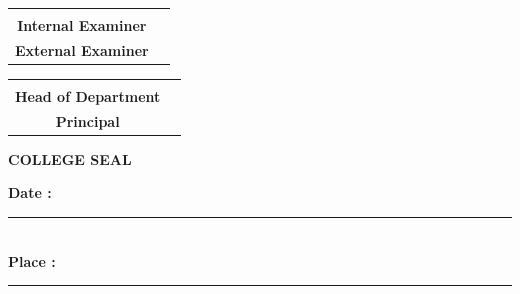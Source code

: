 \begin{center}
\begin{tabular}{cc}
\begin{minipage}{0.42\textwidth}
\centering
\rule{5cm}{0.4pt}\\
\textbf{Internal Examiner}
\end{minipage}
&
\begin{minipage}{0.42\textwidth}
\centering
\rule{5cm}{0.4pt}\\
\textbf{External Examiner}
\end{minipage}
\end{tabular}

\vspace{2.2cm}


\begin{tabular}{cc}
\begin{minipage}{0.42\textwidth}
\centering
\rule{5cm}{0.4pt}\\
\textbf{Head of Department}
\end{minipage}
&
\begin{minipage}{0.42\textwidth}
\centering
\rule{5cm}{0.4pt}\\
\textbf{Principal}
\end{minipage}
\end{tabular}

\vspace{1.5cm}


\textbf{COLLEGE SEAL}

\vspace{2cm}

\begin{flushleft}
\textbf{Date :} \rule{4cm}{0.4pt}\\[0.4cm]
\textbf{Place :} \rule{4cm}{0.4pt}
\end{flushleft}

\end{center}